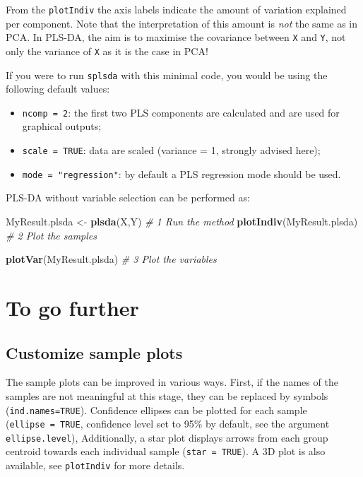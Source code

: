 \documentclass[]{book}
\newenvironment{Shaded}{\begin{snugshade}}{\end{snugshade}}
\newcommand{\KeywordTok}[1]{\textcolor[rgb]{0.13,0.29,0.53}{\textbf{#1}}}
\newcommand{\StringTok}[1]{\textcolor[rgb]{0.31,0.60,0.02}{#1}}
\newcommand{\CommentTok}[1]{\textcolor[rgb]{0.56,0.35,0.01}{\textit{#1}}}
\newcommand{\NormalTok}[1]{#1}
\providecommand{\tightlist}{%
  \setlength{\itemsep}{0pt}\setlength{\parskip}{0pt}}
\theoremstyle{definition}
\theoremstyle{definition}
\theoremstyle{definition}
\theoremstyle{remark}
\begin{document}
From the \texttt{plotIndiv} the axis labels indicate the amount of
variation explained per component. Note that the interpretation of this
amount is \emph{not} the same as in PCA. In PLS-DA, the aim is to
maximise the covariance between \texttt{X} and \texttt{Y}, not only the
variance of \texttt{X} as it is the case in PCA!

If you were to run \texttt{splsda} with this minimal code, you would be
using the following default values:

\begin{itemize}
\tightlist
\item
  \texttt{ncomp\ =\ 2}: the first two PLS components are calculated and
  are used for graphical outputs;
\item
  \texttt{scale\ =\ TRUE}: data are scaled (variance = 1, strongly
  advised here);
\item
  \texttt{mode\ =\ "regression"}: by default a PLS regression mode
  should be used.
\end{itemize}

PLS-DA without variable selection can be performed as:

\begin{Shaded}
\begin{Highlighting}[]
\NormalTok{MyResult.plsda <-}\StringTok{ }\KeywordTok{plsda}\NormalTok{(X,Y) }\CommentTok{# 1 Run the method}
\KeywordTok{plotIndiv}\NormalTok{(MyResult.plsda)    }\CommentTok{# 2 Plot the samples}
\end{Highlighting}
\end{Shaded}

\begin{Shaded}
\begin{Highlighting}[]
\KeywordTok{plotVar}\NormalTok{(MyResult.plsda)      }\CommentTok{# 3 Plot the variables}
\end{Highlighting}
\end{Shaded}

\section{To go further}\label{plsda-tgf}

\subsection{Customize sample plots}\label{splsda:plotIndiv}

The sample plots can be improved in various ways. First, if the names of
the samples are not meaningful at this stage, they can be replaced by
symbols (\texttt{ind.names=TRUE}). Confidence ellipses can be plotted
for each sample (\texttt{ellipse\ =\ TRUE}, confidence level set to 95\%
by default, see the argument \texttt{ellipse.level}), Additionally, a
star plot displays arrows from each group centroid towards each
individual sample (\texttt{star\ =\ TRUE}). A 3D plot is also available,
see \texttt{plotIndiv} for more details.
\end{document}
